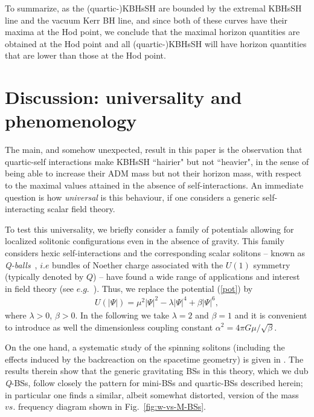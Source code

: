 To summarize, as the (quartic-)KBHsSH are bounded by the extremal KBHsSH line and the vacuum Kerr BH line,  and since both of these curves have their maxima at the Hod point, 
we conclude that the maximal horizon quantities are obtained at the Hod point and all 
(quartic-)KBHsSH will have horizon quantities that are
lower than those at the Hod point.



\section{Discussion: universality and phenomenology}
\label{sec_V}
The main, and somehow unexpected, result in this paper is the observation that quartic-self interactions make KBHsSH ``hairier" but not ``heavier", in the sense of being able to increase their ADM mass but not their horizon mass, with respect to the maximal values attained in the absence of self-interactions. An immediate question is how \textit{universal} is this behaviour, if one considers a generic self-interacting scalar field theory.




To test this universality, we briefly consider a family of potentials allowing for localized solitonic configurations even in the absence of gravity. This family  considers hexic self-interactions and the corresponding scalar solitons -- known as \textit{Q-balls}~\cite{Coleman:1985ki,Lee:1991ax}, $i.e$ bundles of Noether charge associated with the $U(1)$ symmetry (typically denoted by $Q$)  -- have found a wide range of applications and interest in field theory (see $e.g.$~\cite{Kusenko:1997si,Enqvist:1997si}).  Thus, we replace the potential (\ref{pot}) by  
\begin{eqnarray}
U(|\Psi|)= \mu^2\left|\Psi\right|^2 - \lambda\left|\Psi\right|^4+  \beta\left|\Psi\right|^6,
\end{eqnarray}
where $\lambda>0$, $\beta>0$. In the following we take $\lambda=2$ and $\beta=1$ 
and it is convenient to introduce 
as well the dimensionless coupling constant $\alpha^2=4\pi G\mu/\sqrt{\beta}$.



On the one hand, a systematic study of the spinning solitons 
(including the effects induced by the backreaction on the spacetime geometry) 
is given in \cite{Kleihaus:2005me}.
The results therein show that the
 generic gravitating BSs in this theory, which we dub \textit{Q}-BSs, follow closely the pattern for mini-BSs and quartic-BSs described herein; in particular 
one finds a similar, albeit somewhat distorted, version of the mass $vs.$ frequency diagram shown in Fig.~\ref{fig:w-vs-M-BSs}.

